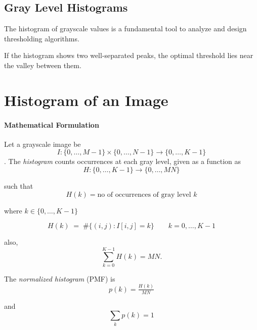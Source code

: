 \subsection{Gray Level Histograms}
The histogram of grayscale values is a fundamental tool to analyze and design thresholding algorithms.

{If the histogram shows two well-separated peaks, the optimal threshold lies near the valley between them.}



\section{Histogram of an Image}

\paragraph{Mathematical Formulation}

Let a grayscale image be
$$I:\{0,\dots,M\!-\!1\}\times\{0,\dots,N\!-\!1\}\to\{0,\dots,K\!-\!1\}$$. 
The \emph{histogram} counts occurrences at each gray level, given as a function as 
$$H:\{0,\dots,K\!-\!1\}\to\{0,\dots,MN\}$$

such that 
$$ H(k) = \text{no of occurrences of gray level } k$$ 

where $k \in \{0,\dots,K-1\}$

\[
H(k) \;=\; \#\{(i,j): I[i,j]=k\} \qquad k=0,\dots,K-1
\]

also, 
\[
\sum_{k=0}^{K-1} H(k)=MN.
\]

\noindent The \emph{normalized histogram} (PMF) is $$p(k)=\tfrac{H(k)}{MN}$$

and $$\sum_k p(k)=1$$



